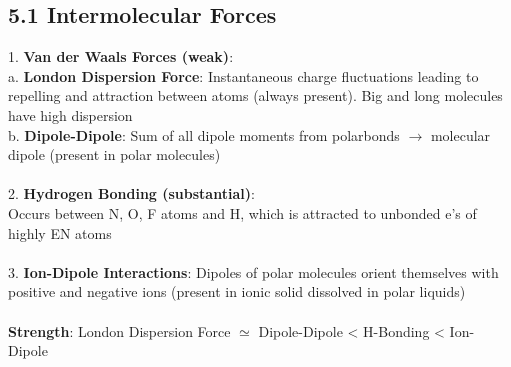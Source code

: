 \subsection{5.1 Intermolecular Forces}
1. \textbf{Van der Waals Forces (weak)}:\\
a. \textbf{London Dispersion Force}: Instantaneous charge fluctuations leading to repelling and attraction between atoms (always present). Big and long molecules have high dispersion\\
b. \textbf{Dipole-Dipole}: Sum of all dipole moments from polarbonds $\longrightarrow$ molecular dipole (present in polar molecules)\\
\vspace{1pt}\\
2. \textbf{Hydrogen Bonding (substantial)}:\\
Occurs between N, O, F atoms and H, which is attracted to unbonded e's of highly EN atoms\\
\vspace{1pt}\\
3. \textbf{Ion-Dipole Interactions}: Dipoles of polar molecules orient themselves with positive and negative ions (present in ionic solid dissolved in polar liquids)\\
\vspace{1pt}\\
\textbf{Strength}: London Dispersion Force $\simeq$ Dipole-Dipole < H-Bonding < Ion-Dipole